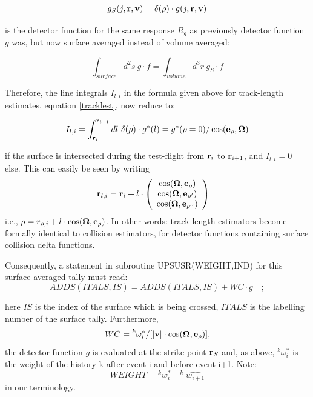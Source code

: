 \begin{displaymath}
  g_S (j, \mathbf{r}, \mathbf{v} ) = \delta(\rho)  \cdot  g(j, \mathbf{r}, \mathbf{v} )
\end{displaymath}

is the detector function for the same response $ R_g $ as previously detector
function $g$ was, but now surface averaged instead of volume averaged:

\begin{displaymath}
  \int_{surface}   d^2 s  \ g  \cdot	f =
  \int_{volume}  d^3 r \
  g_S	\cdot	f
\end{displaymath}

Therefore, the line integrals $ I_{l,i} $ in the formula given above for
track-length estimates, equation \cref{tracklest}, now reduce to:

\begin{equation}
  I_{l,i} = \int_{\mathbf{r}_i}^{\mathbf{r}_{i+1}} dl \  \delta(\rho)  \cdot	g^{*} (l) =
  g^{*} (\rho=0)	    /  \cos( \mathbf{e}_{\rho}, \mathbf{\Omega} )
\end{equation}

if the surface is intersected during the test-flight from $ \mathbf{r}_i $ to $
  \mathbf{r}_{i+1} $, and $ I_{l,i} = 0 $ else.
This can easily be seen by writing
\begin{align}
  \mathbf{r}_{l,i} & = \mathbf{r}_i + l  \cdot
  \left(
    \begin{array} {c} \cos(\mathbf{\Omega}, \mathbf{e}_{\rho} ) \\
      \cos(\mathbf{\Omega}, \mathbf{e}_{\rho '} )
      \\  \cos(\mathbf{\Omega},\mathbf{e}_{\rho ''})
    \end{array}
  \right)
\end{align}
i.e., $\rho= r_{\rho, i} + l  \cdot  \cos( \mathbf{\Omega}, \mathbf{e}_{\rho} )$.
In other words: track-length estimators become formally identical to collision
estimators, for detector functions containing surface collision delta
functions.

Consequently, a statement in subroutine UPSUSR(WEIGHT,IND) for this surface
averaged tally must read:
\begin{displaymath}
  ADDS(ITALS,IS)=ADDS(ITALS,IS) + WC   \cdot   g	\quad ;
\end{displaymath}

here $IS$ is the index of the surface which is being crossed, $ITALS$ is the
labelling number of the surface tally.
Furthermore,
\begin{displaymath}
  WC= {^k{\omega^{*}_i}}  /  [ |\mathbf{v} | \cdot
  \cos( \mathbf{\Omega}, \mathbf{e}_{\rho} ) ],
\end{displaymath}
the detector function $g$ is
evaluated at the strike point $ \mathbf{r}_S $ and, as above, $ {^k{\omega^{*}_i}}  $
is the weight of the history k after event i and before event i+1.
Note:
\begin{displaymath}
  WEIGHT = {^k {w^{*}_i}} = ^k {\hat{w_{i+1}}}
\end{displaymath}
in our
terminology.

